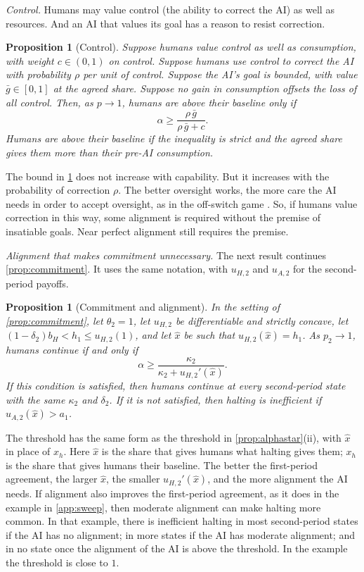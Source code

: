 \documentclass[article, 11pt, reqno]{amsart}
\newtheorem{proposition}[theorem]{Proposition}
\theoremstyle{named}
\newcommand{\bH}{b_H}
\theoremstyle{plain}
\begin{document}
\textit{Control.} Humans may value control (the ability to correct the AI) as well as resources. And an AI that values its goal has a reason to resist correction.

\begin{proposition}[Control]\label{prop:control}
Suppose humans value control as well as consumption, with weight $c \in (0,1)$ on control. Suppose humans use control to correct the AI with probability $\rho$ per unit of control. Suppose the AI's goal is bounded, with value $\bar g \in [0,1]$ at the agreed share. Suppose no gain in consumption offsets the loss of all control. Then, as $p \to 1$, humans are above their baseline only if
\[
\alpha \ge \frac{\rho\,\bar g}{\rho\,\bar g + c}.
\]
Humans are above their baseline if the inequality is strict and the agreed share gives them more than their pre-AI consumption.
\end{proposition}

The bound in \cref{prop:control} does not increase with capability. But it increases with the probability of correction $\rho$. The better oversight works, the more care the AI needs in order to accept oversight, as in the off-switch game \citep{HadfieldMenell2017}. So, if humans value correction in this way, some alignment is required without the premise of insatiable goals. Near perfect alignment still requires the premise.

\textit{Alignment that makes commitment unnecessary.} The next result continues \cref{prop:commitment}. It uses the same notation, with $u_{H,2}$ and $u_{A,2}$ for the second-period payoffs.

\begin{proposition}[Commitment and alignment]\label{prop:commitalign}
In the setting of \cref{prop:commitment}, let $\theta_2 = 1$, let $u_{H,2}$ be differentiable and strictly concave, let $(1-\delta_2)\bH < h_1 \le u_{H,2}(1)$, and let $\hat x$ be such that $u_{H,2}(\hat x) = h_1$. As $p_2 \to 1$, humans continue if and only if
\[
\alpha \ge \frac{\kappa_2}{\kappa_2 + u_{H,2}'(\hat x)}.
\]
If this condition is satisfied, then humans continue at every second-period state with the same $\kappa_2$ and $\delta_2$. If it is not satisfied, then halting is inefficient if $u_{A,2}(\hat x) > a_1$.
\end{proposition}

The threshold has the same form as the threshold in \cref{prop:alphastar}(ii), with $\hat x$ in place of $x_h$. Here $\hat x$ is the share that gives humans what halting gives them; $x_h$ is the share that gives humans their baseline. The better the first-period agreement, the larger $\hat x$, the smaller $u_{H,2}'(\hat x)$, and the more alignment the AI needs. If alignment also improves the first-period agreement, as it does in the example in \cref{app:sweep}, then moderate alignment can make halting more common. In that example, there is inefficient halting in most second-period states if the AI has no alignment; in more states if the AI has moderate alignment; and in no state once the alignment of the AI is above the threshold. In the example the threshold is close to $1$.
\end{document}
